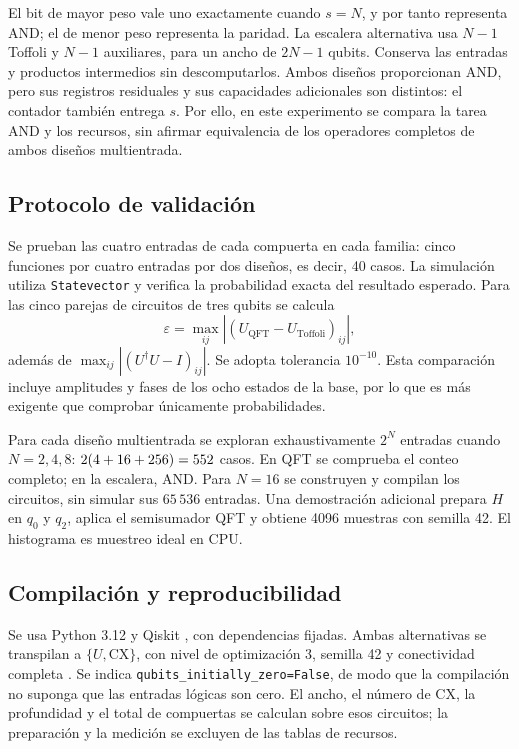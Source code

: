 \documentclass[10pt,a4paper,twocolumn]{article}
\begin{document}
El bit de mayor peso vale uno exactamente cuando $s=N$, y por tanto representa
AND; el de menor peso representa la paridad. La escalera alternativa usa
$N-1$ Toffoli y $N-1$ auxiliares, para un ancho de $2N-1$ qubits. Conserva
las entradas y productos intermedios sin descomputarlos. Ambos diseños
proporcionan AND, pero sus registros residuales y sus capacidades adicionales
son distintos: el contador también entrega $s$. Por ello, en este experimento
se compara la tarea AND y los recursos, sin afirmar equivalencia de los
operadores completos de ambos diseños multientrada.

\subsection{Protocolo de validación}
Se prueban las cuatro entradas de cada compuerta en cada familia: cinco
funciones por cuatro entradas por dos diseños, es decir, 40 casos.
La simulación utiliza \texttt{Statevector} \cite{statedocs} y verifica la
probabilidad exacta del resultado esperado. Para las cinco parejas de
circuitos de tres qubits se calcula
\begin{equation}
\varepsilon=\max_{ij}|(U_{\mathrm{QFT}}-U_{\mathrm{Toffoli}})_{ij}|,
\end{equation}
además de $\max_{ij}|(U^\dagger U-I)_{ij}|$. Se adopta tolerancia $10^{-10}$.
Esta comparación incluye amplitudes y fases de los ocho estados de la base,
por lo que es más exigente que comprobar únicamente probabilidades.

Para cada diseño multientrada se exploran exhaustivamente $2^N$ entradas
cuando $N=2,4,8$: $2(4+16+256)=552{}$ casos.
En QFT se comprueba el conteo completo; en la escalera, AND.
Para $N=16$ se construyen y compilan los circuitos, sin simular sus
$65\,536$ entradas. Una demostración adicional prepara $H$ en $q_0$ y $q_2$,
aplica el semisumador QFT y obtiene 4096 muestras con semilla 42.
El histograma es muestreo ideal en CPU.

\subsection{Compilación y reproducibilidad}
Se usa Python 3.12 y Qiskit \QiskitVersion{}, con dependencias fijadas.
Ambas alternativas se transpilan a $\{U,\mathrm{CX}\}$, con nivel de
optimización 3, semilla 42 y conectividad completa \cite{compiledocs}.
Se indica \texttt{qubits\_initially\_zero=False}, de modo que la compilación
no suponga que las entradas lógicas son cero.
El ancho, el número de CX, la profundidad y el total de compuertas se
calculan sobre esos circuitos; la preparación y la medición se excluyen
de las tablas de recursos.
\end{document}
